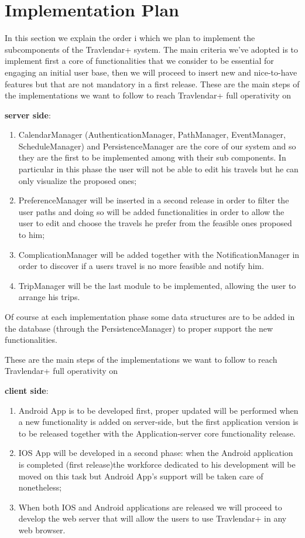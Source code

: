 \section{Implementation Plan}
In this section we explain the order i which we plan to implement the subcomponents of the Travlendar+ system.
The main criteria we've adopted is to implement first a core of functionalities that we consider to be essential for engaging an initial user base, then we will proceed to insert new and nice-to-have features but that are not mandatory in a first release.
These are the main steps of the implementations we want to follow to reach Travlendar+ full operativity on\begin{large}
\textbf{server side}:
\end{large}
\begin{enumerate}
\item CalendarManager (AuthenticationManager, PathManager, EventManager, ScheduleManager) and PersistenceManager are the core of our system and so they are the first to be implemented among with their sub components. In particular in this phase the user will not be able to edit his travels but he can only visualize the proposed ones;
\item PreferenceManager will be inserted in a second release in order to filter the user paths and doing so will be added functionalities in order to allow the user to edit and choose the travels he prefer from the feasible ones proposed to him;
\item ComplicationManager will be added together with the NotificationManager in order to discover if a users travel is no more feasible and notify him.
\item TripManager will be the last module to be implemented, allowing the user to arrange his trips.
\end{enumerate}
Of course at each implementation phase some data structures are to be added in the database (through the PersistenceManager) to proper support the new functionalities.

These are the main steps of the implementations we want to follow to reach Travlendar+ full operativity on\begin{large}
\textbf{client side}:
\end{large}
\begin{enumerate}
\item Android App is to be developed first, proper updated will be performed when a new functionality is added on server-side, but the first application version is to be released together with the Application-server core functionality release.
\item IOS App will be developed in a second phase: when the Android application is completed (first release)the workforce dedicated to his development will be moved on this task but Android App's support will be taken care of nonetheless;
\item When both IOS and Android applications are released we will proceed to develop the web server that will allow the users to use Travlendar+ in any web browser.
\end{enumerate}

